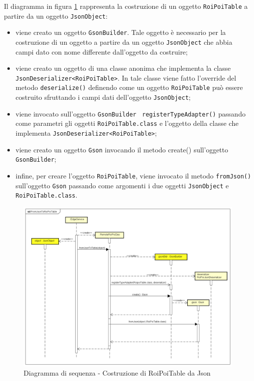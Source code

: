 \documentclass[../DefinizioneDiProdotto.tex]{subfiles}
\begin{document}
		Il diagramma in figura \ref{fig:FromJsonToRoiPoiTable} rappresenta la costruzione di un oggetto \verb|RoiPoiTable| a partire da un oggetto \verb|JsonObject|:
		\begin{itemize}
			\item viene creato un oggetto \verb|GsonBuilder|. Tale oggetto è necessario per la costruzione di un oggetto a partire da un oggetto \verb|JsonObject| che abbia campi dato con nome differente dall'oggetto da costruire;
			\item viene creato un oggetto di una classe anonima che implementa la classe \verb|JsonDeserializer<RoiPoiTable>|. In tale classe viene fatto l'override del metodo \verb|deserialize()| definendo come un oggetto \verb|RoiPoiTable| può essere costruito sfruttando i campi dati dell'oggetto \verb|JsonObject|;
			\item viene invocato sull'oggetto \verb|GsonBuilder | \verb|registerTypeAdapter()| passando come parametri gli oggetti \verb|RoiPoiTable.class| e l'oggetto della classe che implementa \verb|JsonDeserializer<RoiPoiTable>|;
			\item viene creato un oggetto \verb|Gson| invocando il metodo create() sull'oggetto \verb|GsonBuilder|;
			\item infine, per creare l'oggetto \verb|RoiPoiTable|, viene invocato il metodo \verb|fromJson()| sull'oggetto \verb|Gson| passando come argomenti i due oggetti \verb|JsonObject| e \verb|RoiPoiTable.class|.
		\end{itemize}
		\begin{figure} [p]
			\includegraphics[width=\textwidth]{diagrams/FromJsonToRoiPoiTable}
			\caption{Diagramma di sequenza - Costruzione di RoiPoiTable da Json}
			\label{fig:FromJsonToRoiPoiTable}
		\end{figure}
		
\end{document}
